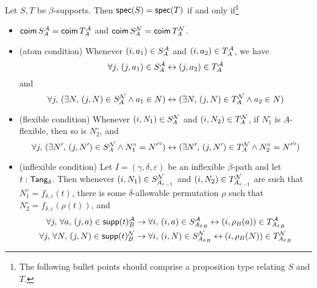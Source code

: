 \begin{proposition}
  \label{prop:spec_eq_spec_iff}
  Let \( S, T \) be \( \beta \)-supports.
  Then \( \operatorname{\mathsf{spec}}(S) = \operatorname{\mathsf{spec}}(T) \) if and only if\footnote{The following bullet points should comprise a proposition type relating \( S \) and \( T \).}
  \begin{itemize}
    \item \( \operatorname{\mathsf{coim}} S_A^{\mathcal A} = \operatorname{\mathsf{coim}} T_A^{\mathcal A} \) and \( \operatorname{\mathsf{coim}} S_A^{\mathcal N} = \operatorname{\mathsf{coim}} T_A^{\mathcal N} \).
    \item (atom condition) Whenever \( (i, a_1) \in S_A^{\mathcal A} \) and \( (i, a_2) \in T_A^{\mathcal A} \), we have
    \[ \forall j,\, (j, a_1) \in S_A^{\mathcal A} \leftrightarrow (j, a_2) \in T_A^{\mathcal A} \]
    and
    \[ \forall j,\, (\exists N,\, (j, N) \in S_A^{\mathcal N} \wedge a_1 \in N) \leftrightarrow (\exists N,\, (j, N) \in T_A^{\mathcal N} \wedge a_2 \in N) \]
    \item (flexible condition) Whenever \( (i, N_1) \in S_A^{\mathcal N} \) and \( (i, N_2) \in T_A^{\mathcal N} \), if \( N_1^\circ \) is \( A \)-flexible, then so is \( N_2^\circ \), and
    \[ \forall j,\, (\exists N',\, (j, N') \in S_A^{\mathcal N} \wedge N_1^\circ = {N'}^\circ) \leftrightarrow (\exists N',\, (j, N') \in T_A^{\mathcal N} \wedge N_2^\circ = {N'}^\circ) \]
    \item (inflexible condition) Let \( I = (\gamma,\delta,\varepsilon) \) be an inflexible \( \beta \)-path and let \( t : \mathsf{Tang}_\delta \).
    Then whenever \( (i, N_1) \in S_{{A_\varepsilon}_{-1}}^{\mathcal N} \) and \( (i, N_2) \in T_{{A_\varepsilon}_{-1}}^{\mathcal N} \) are such that \( N_1^\circ = f_{\delta,\varepsilon}(t) \), there is some \( \delta \)-allowable permutation \( \rho \) such that \( N_2^\circ = f_{\delta,\varepsilon}(\rho(t)) \), and
    \begin{align*}
      \forall j,\, \forall a,\, (j, a) \in \operatorname{\mathsf{supp}}(t)_B^{\mathcal A} &\to \forall i,\, (i, a) \in S_{{A_\delta}_B}^{\mathcal A} \leftrightarrow (i, \rho_B(a)) \in T_{{A_\delta}_B}^{\mathcal A} \\
      \forall j,\, \forall N,\, (j, N) \in \operatorname{\mathsf{supp}}(t)_B^{\mathcal N} &\to \forall i,\, (i, N) \in S_{{A_\delta}_B}^{\mathcal N} \leftrightarrow (i, \rho_B(N)) \in T_{{A_\delta}_B}^{\mathcal N}
    \end{align*}
  \end{itemize}
\end{proposition}
